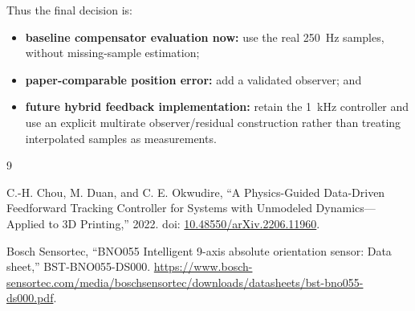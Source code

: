 \documentclass[11pt,a4paper]{article}
\begin{document}
Thus the final decision is:

\begin{itemize}
    \item \textbf{baseline compensator evaluation now:} use the real
    \SI{250}{Hz} samples, without missing-sample estimation;
    \item \textbf{paper-comparable position error:} add a validated observer;
    and
    \item \textbf{future hybrid feedback implementation:} retain the
    \SI{1}{kHz} controller and use an explicit multirate observer/residual
    construction rather than treating interpolated samples as measurements.
\end{itemize}

\begin{thebibliography}{9}

C.-H. Chou, M. Duan, and C. E. Okwudire,
\newblock ``A Physics-Guided Data-Driven Feedforward Tracking Controller for
Systems with Unmodeled Dynamics---Applied to 3D Printing,'' 2022.
\newblock doi: \href{https://doi.org/10.48550/arXiv.2206.11960}%
{10.48550/arXiv.2206.11960}.

Bosch Sensortec,
\newblock ``BNO055 Intelligent 9-axis absolute orientation sensor: Data sheet,''
BST-BNO055-DS000.
\newblock \url{https://www.bosch-sensortec.com/media/boschsensortec/downloads/datasheets/bst-bno055-ds000.pdf}.

\end{thebibliography}
\end{document}
